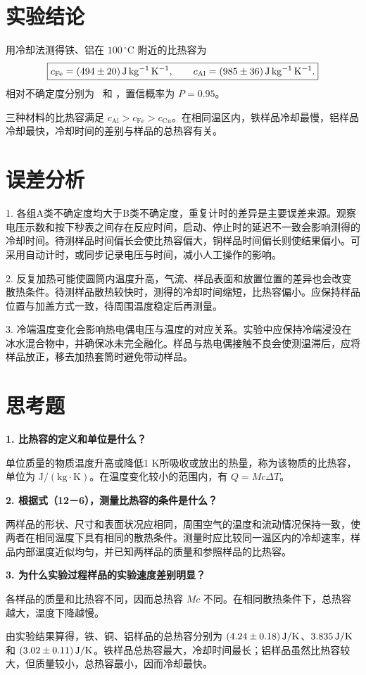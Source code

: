 \documentclass[12pt,a4paper,fontset=fandol]{ctexart}
\newcommand{\unitc}{\mathrm{J\,kg^{-1}\,K^{-1}}}
\begin{document}
\section{实验结论}
用冷却法测得铁、铝在 $100\,{}^\circ\mathrm C$ 附近的比热容为
\[
\boxed{c_{\mathrm{Fe}}=\FeCFinal\,\unitc,\qquad
c_{\mathrm{Al}}=\AlCFinal\,\unitc.}
\]
相对不确定度分别为 \FeCRel\ 和 \AlCRel，置信概率为 $P=0.95$。

三种材料的比热容满足 $c_{\mathrm{Al}}>c_{\mathrm{Fe}}>c_{\mathrm{Cu}}$。在相同温区内，铁样品冷却最慢，铝样品冷却最快，冷却时间的差别与样品的总热容有关。

\section{误差分析}
1. 各组A类不确定度均大于B类不确定度，重复计时的差异是主要误差来源。观察电压示数和按下秒表之间存在反应时间，启动、停止时的延迟不一致会影响测得的冷却时间。待测样品时间偏长会使比热容偏大，铜样品时间偏长则使结果偏小。可采用自动计时，或同步记录电压与时间，减小人工操作的影响。

2. 反复加热可能使圆筒内温度升高，气流、样品表面和放置位置的差异也会改变散热条件。待测样品散热较快时，测得的冷却时间缩短，比热容偏小。应保持样品位置与加盖方式一致，待周围温度稳定后再测量。

3. 冷端温度变化会影响热电偶电压与温度的对应关系。实验中应保持冷端浸没在冰水混合物中，并确保冰未完全融化。样品与热电偶接触不良会使测温滞后，应将样品放正，移去加热套筒时避免带动样品。

\section{思考题}
\noindent\textbf{1. 比热容的定义和单位是什么？}

单位质量的物质温度升高或降低1 K所吸收或放出的热量，称为该物质的比热容，单位为 $\mathrm{J/(kg\cdot K)}$。在温度变化较小的范围内，有 $Q=Mc\Delta T$。

\medskip\noindent\textbf{2. 根据式（12－6），测量比热容的条件是什么？}

两样品的形状、尺寸和表面状况应相同，周围空气的温度和流动情况保持一致，使两者在相同温度下具有相同的散热条件。测量时应比较同一温区内的冷却速率，样品内部温度近似均匀，并已知两样品的质量和参照样品的比热容。

\medskip\noindent\textbf{3. 为什么实验过程样品的实验速度差别明显？}

各样品的质量和比热容不同，因而总热容 $Mc$ 不同。在相同散热条件下，总热容越大，温度下降越慢。

由实验结果算得，铁、铜、铝样品的总热容分别为 $(4.24\pm 0.18)\,\mathrm{J/K}$、$3.835\,\mathrm{J/K}$ 和 $(3.02\pm 0.11)\,\mathrm{J/K}$。铁样品总热容最大，冷却时间最长；铝样品虽然比热容较大，但质量较小，总热容最小，因而冷却最快。
\end{document}
